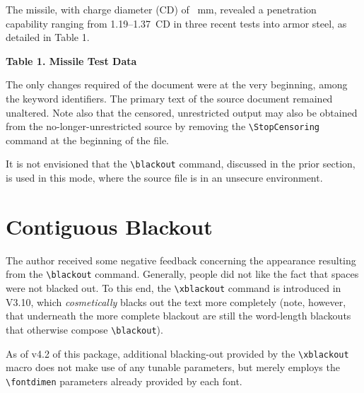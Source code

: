 \documentclass{article}
\begin{document}
{The {\Missile} missile, with charge diameter (CD) of
{\Size}~mm, revealed a penetration capability ranging
from 1.19--1.37~CD in three recent tests into armor
steel, as detailed in Table 1.

\begin{table}[ht]
\begin{center}
\textbf{Table 1. {\Missile} Missile Test Data}\\
{\TableOne}
\end{center}
\end{table}

\hrulefill

}

The only changes required of the document were at the very beginning,
among the keyword identifiers.  The primary text of the source document
remained unaltered.  Note also that the censored, unrestricted output
may also be obtained from the no-longer-unrestricted source by removing
the \verb|\StopCensoring| command at the beginning of the file.

It is not envisioned that the \verb|\blackout|
command, discussed in the prior section, is used in this mode, where
the source file is in an unsecure environment.

\section{Contiguous Blackout}

The author received some negative feedback concerning the appearance
  resulting from the \verb|\blackout| command.  Generally, people did not
  like the fact that spaces were not blacked out.  
To this end, the \verb|\xblackout| command is introduced in V3.10, which 
  \textit{cosmetically} blacks out the text more completely
  (note, however, that underneath the more complete blackout are still
  the word-length blackouts that otherwise compose \verb|\blackout|).

As of v4.2 of this package, 
  additional blacking-out provided by the \verb|\xblackout| macro 
  does not make use of any tunable parameters, but merely employs
  the \verb|\fontdimen| parameters already provided by each font.

\end{document}
